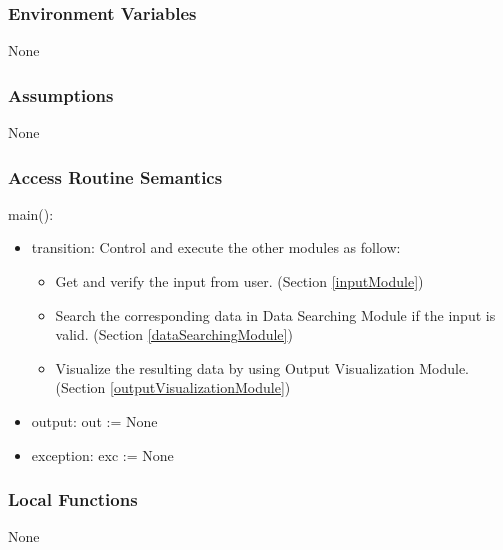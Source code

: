 \documentclass[12pt, titlepage]{article}
\begin{document}
\subsubsection{Environment Variables}

None


\subsubsection{Assumptions}

None

\subsubsection{Access Routine Semantics}

\noindent main():
\begin{itemize}
\item transition: Control and execute the other modules as follow:
\begin{itemize}
\item Get and verify the input from user. (Section \ref{inputModule}) 
\item Search the corresponding data in Data Searching Module if the input is valid. (Section \ref{dataSearchingModule})
\item Visualize the resulting data by using Output Visualization Module. (Section \ref{outputVisualizationModule})

\end{itemize}
\item output: out := None
\item exception: exc := None
\end{itemize}



\subsubsection{Local Functions}
None
  
\end{document}
